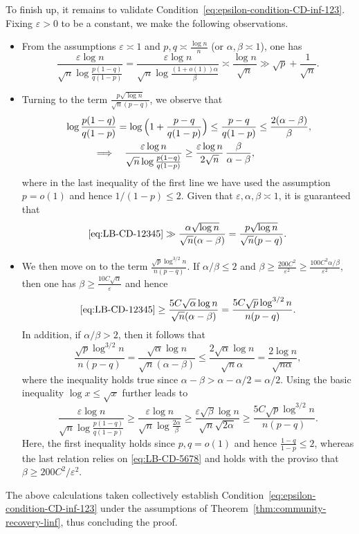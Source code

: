 To finish up, it remains to validate Condition~\eqref{eq:epsilon-condition-CD-inf-123}. 
Fixing $\varepsilon>0$ to be a constant, we make the following observations. 
%
\begin{itemize}
	\item From the assumptions $\varepsilon \asymp 1$ and $p,q\asymp \frac{\log n}{n}$ (or $\alpha,\beta \asymp 1$), one has
	\[
		\frac{\varepsilon\log n}{\sqrt{n}\log\frac{p(1-q)}{q(1-p)}}=\frac{\varepsilon\log n}{\sqrt{n}\log\frac{(1+o(1))\alpha}{\beta}}
		\asymp \frac{\log n}{\sqrt{n}}\gg \sqrt{p}+\frac{1}{\sqrt{n}}.
	\]
	\item Turning to the term $\frac{p\sqrt{\log n}}{\sqrt{n}(p-q)}$,   we  observe that 
	\begin{align}
		& \log\frac{p(1-q)}{q(1-p)}=\log\Big(1+\frac{p-q}{q(1-p)}\Big)\leq\frac{p-q}{q(1-p)}\leq\frac{2(\alpha-\beta)}{\beta}, \notag\\
		& \qquad\quad \Longrightarrow \quad 
		\frac{\varepsilon\log n}{\sqrt{n}\log\frac{p(1-q)}{q(1-p)}}\geq\frac{\varepsilon\log n}{2\sqrt{n}}\,\frac{\beta}{\alpha-\beta},
		\label{eq:LB-CD-12345}
	\end{align}
	where in the last inequality of the  first line we have used the assumption $p=o(1)$ and hence $1/(1-p) \leq 2$. 
	Given that $\varepsilon, \alpha,\beta \asymp 1$, it is guaranteed that
	\[
		\eqref{eq:LB-CD-12345} \gg \frac{\alpha\sqrt{\log n}}{\sqrt{n}(\alpha-\beta)}=\frac{p\sqrt{\log n}}{\sqrt{n}(p-q)} .
	\]
	\item We then move on to the term $\frac{\sqrt{p}\log^{3/2}n}{n(p-q)}$. 
	If $\alpha / \beta \leq 2$ and  $\beta \geq\frac{200C^{2}}{\varepsilon^{2}} \geq \frac{100C^{2}\alpha/\beta}{\varepsilon^{2}}$, then one  has $\beta \geq \frac{10C\sqrt{\alpha}}{\varepsilon}$ and hence
	\[
		\eqref{eq:LB-CD-12345} \geq\frac{5C\sqrt{\alpha}\log n}{\sqrt{n}(\alpha-\beta)}=\frac{5C\sqrt{p}\log^{3/2}n}{n(p-q)} .
	\]
	 In addition, if $\alpha / \beta > 2$, then it follows that
	\begin{equation}
		\frac{\sqrt{p}\log^{3/2}n}{n(p-q)}=\frac{\sqrt{\alpha}\log n}{\sqrt{n}(\alpha-\beta)}\leq\frac{2\sqrt{\alpha}\log n}{\sqrt{n}\alpha}=\frac{2\log n}{\sqrt{n\alpha}},
		\label{eq:LB-CD-5678}
	\end{equation}
	where the inequality holds true since $\alpha - \beta > \alpha - \alpha/2 = \alpha / 2$. 
	Using the basic inequality $\log x \leq \sqrt{x}$ further leads  to
	\[
		\frac{\varepsilon\log n}{\sqrt{n}\log\frac{p(1-q)}{q(1-p)}}\geq\frac{\varepsilon\log n}{\sqrt{n}\log\frac{2\alpha}{\beta}}
		\geq\frac{\varepsilon\sqrt{\beta}\log n}{\sqrt{n}\sqrt{2\alpha}}\geq\frac{5C\sqrt{p}\log^{3/2}n}{n(p-q)}.
	\]
	Here, the first inequality holds since $p,q=o(1)$ and hence $\frac{1-q}{1-p}\leq 2$, 
	whereas the last relation relies on \eqref{eq:LB-CD-5678} and holds with the proviso that $\beta\geq200C^{2}/\varepsilon^{2}$. 
	
 
\end{itemize}
%
The above calculations taken collectively establish Condition~\eqref{eq:epsilon-condition-CD-inf-123} under the assumptions of Theorem~\ref{thm:community-recovery-linf}, thus concluding the proof. 



